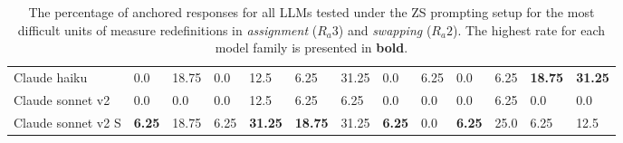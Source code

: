 \begin{table*}[h!]
\begin{tabular}{l|p{0.7cm}p{0.6cm}|p{0.7cm}p{0.6cm}|p{0.7cm}p{0.6cm}|p{0.7cm}p{0.6cm}|p{0.7cm}p{0.6cm}|p{0.7cm}p{0.6cm}}
Claude haiku & 0.0 & 18.75 & 0.0 & 12.5 & 6.25 & 31.25 & 0.0 & 6.25 & 0.0 & 6.25 & \textbf{18.75} & \textbf{31.25} \\ 
Claude sonnet v2 & 0.0 & 0.0 & 0.0 & 12.5 & 6.25 & 6.25 & 0.0 & 0.0 & 0.0 & 6.25 & 0.0 & 0.0 \\ 
Claude sonnet v2 S& \textbf{6.25} & 18.75 & 6.25 & \textbf{31.25} & \textbf{18.75} & 31.25 & \textbf{6.25} & 0.0 & \textbf{6.25} & 25.0 & 6.25 & 12.5 \\
\hline
\end{tabular}

\caption{The percentage of anchored responses for all LLMs tested under the ZS prompting setup for the most difficult units of measure redefinitions in \textit{assignment} ($R_{a}3$) and \textit{swapping} ($R_{a}2$). The highest rate for each model family is presented in \textbf{bold}.}
\label{tab:anchored_table_units}
\end{table*}




